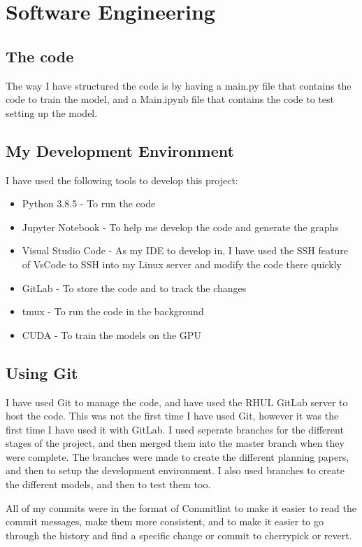 \documentclass[]{final_report}
\begin{document}
\chapter{Software Engineering}
\section{The code}
The way I have structured the code is by having a main.py file that contains the code to train the model, and a Main.ipynb file that contains the code to test setting up the model.

\section{My Development Environment}
I have used the following tools to develop this project:
\begin{itemize}
    \item Python 3.8.5\cite{Python} - To run the code
    \item Jupyter Notebook\cite{Jupyter} - To help me develop the code and generate the graphs
    \item Visual Studio Code\cite{VsCode} - As my IDE to develop in, I have used the SSH feature of VsCode to SSH into my Linux server and modify the code there quickly
    \item GitLab\cite{RHULGitLab} - To store the code and to track the changes
    \item tmux\cite{tmux} - To run the code in the background
    \item CUDA\cite{CUDA} - To train the models on the GPU
\end{itemize}

\section{Using Git}
I have used Git to manage the code, and have used the RHUL GitLab server to host the code.
This was not the first time I have used Git, however it was the first time I have used it with GitLab.
I used seperate branches for the different stages of the project, and then merged them into the master branch when they were complete.
The branches were made to create the different planning papers, and then to setup the development environment.
I also used branches to create the different models, and then to test them too.

All of my commits were in the format of Commitlint\cite{CommitLint} to make it easier to read the commit messages, make them more consistent, 
and to make it easier to go through the history and find a specific change or commit to cherrypick or revert.
\end{document}
